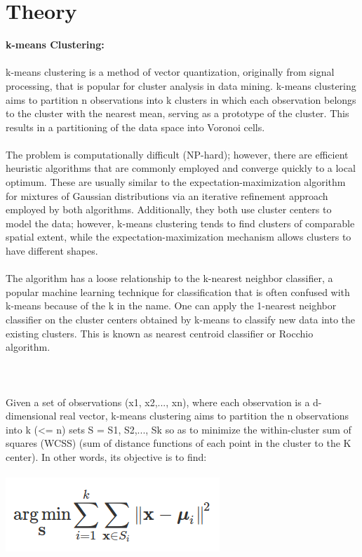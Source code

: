 \documentclass[10pt,a4paper]{article}
\begin{document}
\section{Theory}
\textbf{k-means Clustering:}
\\\\
k-means clustering is a method of vector quantization, originally from signal processing, that is popular for cluster analysis in data mining. k-means clustering aims to partition n observations into k clusters in which each observation belongs to the cluster with the nearest mean, serving as a prototype of the cluster. This results in a partitioning of the data space into Voronoi cells.
\\\\
The problem is computationally difficult (NP-hard); however, there are efficient heuristic algorithms that are commonly employed and converge quickly to a local optimum. These are usually similar to the expectation-maximization algorithm for mixtures of Gaussian distributions via an iterative refinement approach employed by both algorithms. Additionally, they both use cluster centers to model the data; however, k-means clustering tends to find clusters of comparable spatial extent, while the expectation-maximization mechanism allows clusters to have different shapes.
\\\\
The algorithm has a loose relationship to the k-nearest neighbor classifier, a popular machine learning technique for classification that is often confused with k-means because of the k in the name. One can apply the 1-nearest neighbor classifier on the cluster centers obtained by k-means to classify new data into the existing clusters. This is known as nearest centroid classifier or Rocchio algorithm.
\\\\
\\\\
Given a set of observations (x1, x2,..., xn), where each observation is a d-dimensional real vector, k-means clustering aims to partition the n observations into k (<= n) sets S = {S1, S2,..., Sk} so as to minimize the within-cluster sum of squares (WCSS) (sum of distance functions of each point in the cluster to the K center). In other words, its objective is to find:
\\\\
\includegraphics[scale=0.5]{im1.png}
\end{document}
